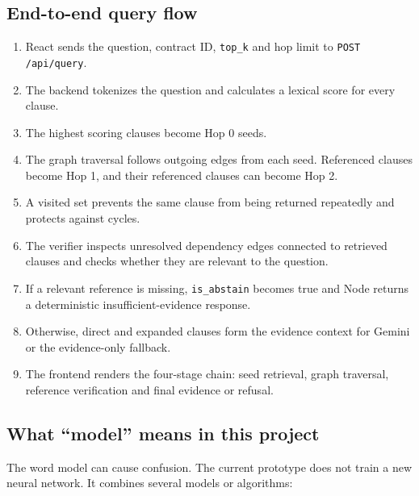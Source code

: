 \documentclass[11pt,letterpaper]{article}
\begin{document}
\subsection{End-to-end query flow}
\begin{enumerate}
  \item React sends the question, contract ID, \texttt{top\_k} and hop limit to \texttt{POST /api/query}.
  \item The backend tokenizes the question and calculates a lexical score for every clause.
  \item The highest scoring clauses become Hop 0 seeds.
  \item The graph traversal follows outgoing edges from each seed. Referenced clauses become Hop 1, and their referenced clauses can become Hop 2.
  \item A visited set prevents the same clause from being returned repeatedly and protects against cycles.
  \item The verifier inspects unresolved dependency edges connected to retrieved clauses and checks whether they are relevant to the question.
  \item If a relevant reference is missing, \texttt{is\_abstain} becomes true and Node returns a deterministic insufficient-evidence response.
  \item Otherwise, direct and expanded clauses form the evidence context for Gemini or the evidence-only fallback.
  \item The frontend renders the four-stage chain: seed retrieval, graph traversal, reference verification and final evidence or refusal.
\end{enumerate}

\newpage
\subsection{What ``model'' means in this project}
The word model can cause confusion. The current prototype does not train a new neural network. It combines several models or algorithms:
\end{document}
